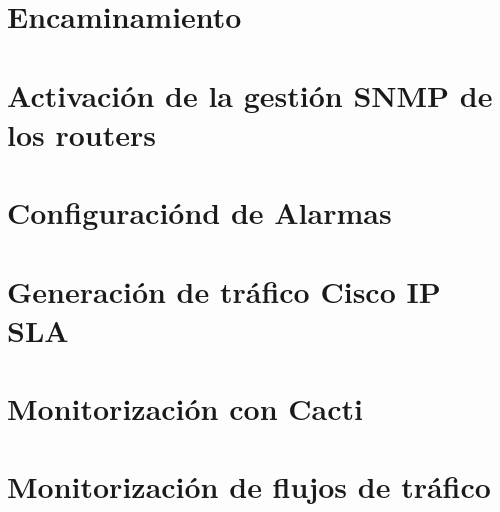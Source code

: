 \documentclass[11pt]{article}
\begin{document}
\section{Encaminamiento}

\section{Activación de la gestión SNMP de los routers}
\section{Configuraciónd de Alarmas}
\section{Generación de tráfico Cisco IP SLA}
\section{Monitorización con Cacti}
\section{Monitorización de flujos de tráfico}
\end{document}
